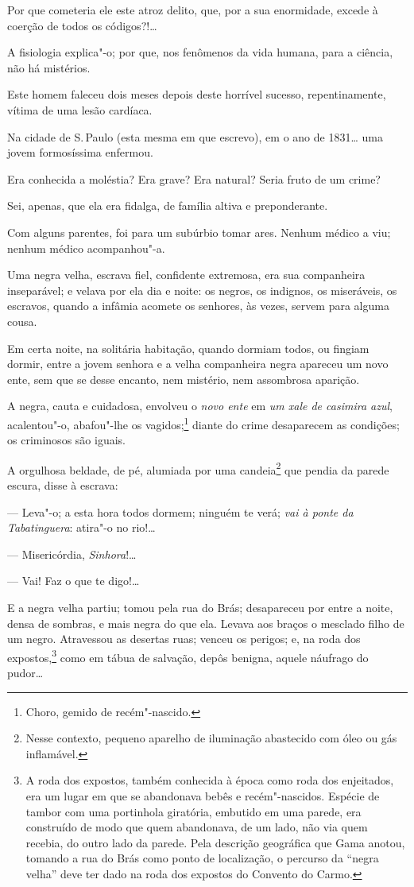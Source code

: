 Por que cometeria ele este atroz delito, que, por a sua enormidade,
excede à coerção de todos os códigos?!\ldots{}

A fisiologia explica"-o; por que, nos fenômenos da vida humana, para a
ciência, não há mistérios.

Este homem faleceu dois meses depois deste horrível sucesso,
repentinamente, vítima de uma lesão cardíaca.

\asterisc

Na cidade de S.\,Paulo (esta mesma em que escrevo), em o ano de
1831\ldots{} uma jovem formosíssima enfermou.

Era conhecida a moléstia? Era grave? Era natural? Seria fruto de um
crime?

Sei, apenas, que ela era fidalga, de família altiva e preponderante.

Com alguns parentes, foi para um subúrbio tomar ares. Nenhum médico a
viu; nenhum médico acompanhou"-a.

Uma negra velha, escrava fiel, confidente extremosa, era sua companheira
inseparável; e velava por ela dia e noite: os negros, os indignos, os
miseráveis, os escravos, quando a infâmia acomete os senhores, às vezes,
servem para alguma cousa.

Em certa noite, na solitária habitação, quando dormiam todos, ou fingiam
dormir, entre a jovem senhora e a velha companheira negra apareceu um
novo ente, sem que se desse encanto, nem mistério, nem assombrosa
aparição.

A negra, cauta e cuidadosa, envolveu o \emph{novo ente} em \emph{um xale
de casimira azul}, acalentou"-o, abafou"-lhe os vagidos;\footnote{Choro,
  gemido de recém"-nascido.} diante do crime desaparecem as condições;
os criminosos são iguais.

A orgulhosa beldade, de pé, alumiada por uma candeia\footnote{Nesse
  contexto, pequeno aparelho de iluminação abastecido com óleo ou gás
  inflamável.} que pendia da parede escura, disse à escrava:

  --- Leva"-o; a esta hora todos dormem; ninguém te verá; \emph{vai à
  ponte da Tabatinguera}: atira"-o no rio!\ldots{}

  --- Misericórdia, \emph{Sinhora}!\ldots{}

  --- Vai! Faz o que te digo!\ldots{}

E a negra velha partiu; tomou pela rua do Brás; desapareceu por entre a
noite, densa de sombras, e mais negra do que ela. Levava aos braços o
mesclado filho de um negro. Atravessou as desertas ruas; venceu os
perigos; e, na roda dos expostos,\footnote{A roda dos expostos, também
  conhecida à época como roda dos enjeitados, era um lugar em que se
  abandonava bebês e recém"-nascidos. Espécie de tambor com uma
  portinhola giratória, embutido em uma parede, era construído de modo
  que quem abandonava, de um lado, não via quem recebia, do outro lado
  da parede. Pela descrição geográfica que Gama anotou, tomando a rua do
  Brás como ponto de localização, o percurso da ``negra velha'' deve ter
  dado na roda dos expostos do Convento do Carmo.} como em tábua de
salvação, depôs benigna, aquele náufrago do pudor\ldots{}

